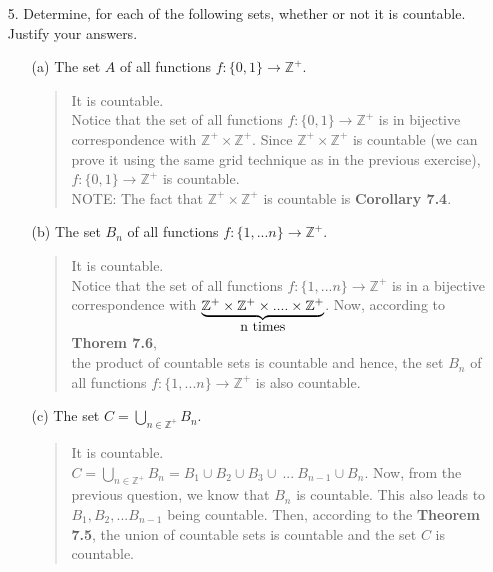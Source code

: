 \documentclass[12pt, a4paper]{article}
\newcommand{\pints}{\mathbb{Z}^+} %
\newcommand{\rarr}{\rightarrow}
\begin{document}
\begin{itemize}
\item[]

\item[5.]
Determine, for each of the following sets, whether or not it is countable. Justify
your answers.
\begin{itemize}
\item[(a)]
The set $A$ of all functions $f : \{0, 1\} \rarr \pints$.
\begin{quote}
It is countable.\\
Notice that the set of all functions $f : \{0, 1\} \rarr \pints$
is in bijective correspondence with $\pints \times \pints$. Since $\pints \times \pints$ is countable
(we can prove it using the same grid technique as in the previous exercise),
$f : \{0, 1\} \rarr \pints$ is countable.\\
\vspace{0.5cm}
NOTE: The fact that $\pints \times \pints$ is countable is \textbf{Corollary 7.4}.\\
\end{quote}

\item[(b)]
The set $B_n$ of all functions $f : \{1, ... n\} \rarr \pints$.
\begin{quote}
It is countable.\\
Notice that the set of all functions $f : \{1, ... n\} \rarr \pints$
is in a bijective correspondence with $\underbrace{\pints \times \pints \times .... \times \pints}_{\text{\normalsize n times}}$.
Now, according to \textbf{Thorem 7.6},\\
\smallskip
the product of countable sets is countable and hence,
the set $B_n$ of all functions $f : \{1, ... n\} \rarr \pints$ is also countable.
\end{quote}

\item[]

\item[(c)]
The set $C = \bigcup_{n \in \pints} B_n$.
\begin{quote}
It is countable.\\
\smallskip
$C = \bigcup_{n \in \pints} B_n = B_1 \cup B_2 \cup B_3 \cup \ ... \ B_{n-1} \cup B_n$.
Now, from the previous question, we know that $B_n$ is countable. This also leads
to $B_1, B_2, ... B_{n - 1}$ being countable. Then, according to the \textbf{Theorem 7.5},
the union of countable sets is countable and the set $C$ is countable.
\end{quote}

\item[]


\end{itemize}
\end{itemize}
\end{document}
